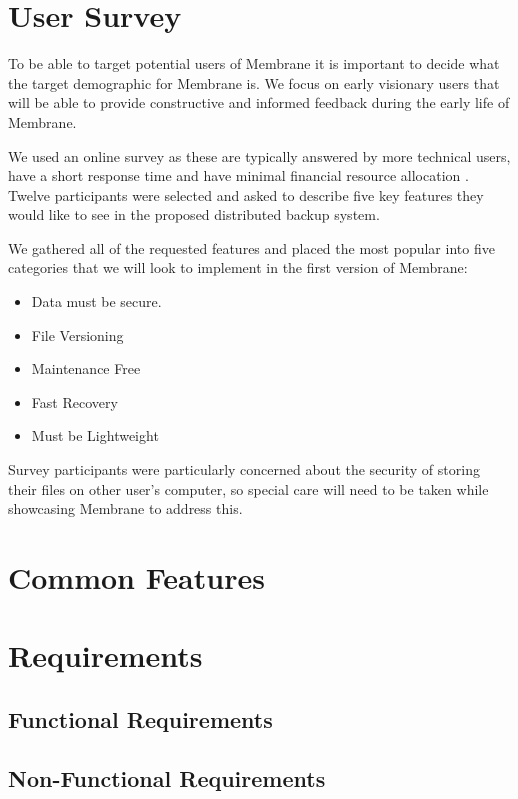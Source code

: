 \documentclass[a4paper, 11pt, twocolumn, twoside]{report}
\begin{document}
\section{User Survey}

To be able to target potential users of Membrane it is important to decide what the target demographic for Membrane is. We focus on early visionary users that will be able to provide constructive and informed feedback during the early life of Membrane.

We used an online survey as these are typically answered by more technical users, have a short response time and have minimal financial resource allocation \citep{ilieva2002online}. Twelve participants were selected and asked to describe five key features they would like to see in the proposed distributed backup system.

We gathered all of the requested features and placed the most popular into five categories that we will look to implement in the first version of Membrane:

\begin{itemize}
 \item Data must be secure.
 \item File Versioning
 \item Maintenance Free
 \item Fast Recovery
 \item Must be Lightweight
\end{itemize}

Survey participants were particularly concerned about the security of storing their files on other user's computer, so special care will need to be taken while showcasing Membrane to address this.


\section{Common Features}

\section{Requirements}

\subsection{Functional Requirements}

\subsection{Non-Functional Requirements}
\end{document}

